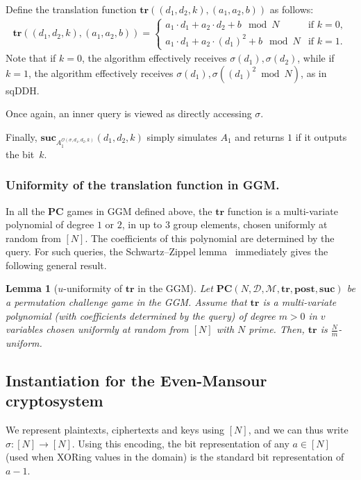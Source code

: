 \documentclass[11pt]{article}
\newtheorem{lemma}[theorem]{Lemma}
\newcommand{\SECS}{{\mathcal{D}}}
\newcommand{\SUC}{\boldsymbol{suc}}
\newcommand{\TR}{\boldsymbol{tr}}
\newcommand{\POST}{\boldsymbol{post}}
\newcommand{\PC}{\boldsymbol{PC}}
\begin{document}
Define the translation function
$\TR((d_1,d_2,k),(a_1,a_2,b))$ as  
follows:
\begin{align*}
\TR((d_1,d_2,k),(a_1,a_2,b) ) =
\begin{cases}
a_1 \cdot d_{1} + a_2 \cdot d_{2}  + b \mod N & \text{if } k=0, \\
a_1 \cdot d_{1} + a_2 \cdot (d_{1})^2 + b \mod N & \text{if } k = 1.
\end{cases}
\end{align*}
Note that if   
$k = 0$, the algorithm effectively receives $\sigma(d_1),\sigma(d_2)$, while if
$k = 1$, the algorithm effectively receives $\sigma(d_1),\sigma((d_1)^2 \bmod N)$, as in sqDDH.

Once again, an inner query is viewed as directly accessing $\sigma$.

Finally, 
$\SUC_{A_1^{\mathcal{O}(\sigma,d_1,d_2,k)}}(d_1,d_2,k)$
simply simulates $A_1$ and returns $1$ if it outputs the bit~$k$.



\subsubsection{Uniformity of the translation function in GGM.}

In all the $\PC$ games in GGM defined above, the $\TR$ function is a multi-variate polynomial of degree $1$ or $2$, in up to $3$ group elements, chosen uniformly at random from $[N]$. The coefficients of this polynomial are determined by the query. For such queries, 
the Schwartz–Zippel lemma~\cite{Schwartz80} immediately gives the following general result.
\begin{lemma}[$u$-uniformity of $\TR$ in the GGM]
\label{lem:ggm uniform}
Let 
$\PC(N,\SECS,\mathcal{M},\TR,\POST,\SUC)$ be a permutation challenge game in the GGM. Assume that $\TR$ is a multi-variate polynomial (with coefficients determined by the query) of degree  $m > 0$ in $v$ variables chosen uniformly at random from $[N]$ with $N$ prime. Then, $\TR$ is $\frac{N}{m}$-uniform.
\end{lemma}

\subsection{Instantiation for the Even-Mansour cryptosystem}
\label{sec:inst EM}

We represent plaintexts, ciphertexts and keys using $[N]$, and we can thus write $\sigma:[N] \rightarrow [N]$.
Using this encoding, the bit representation of any $a \in [N]$ (used when XORing values in the domain) is the standard bit representation of $a - 1$.
\end{document}
